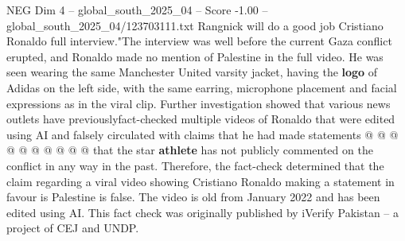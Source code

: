 \begin{textsample}{NEG Dim 4 – global\_south\_2025\_04 – Score -1.00 – global\_south\_2025\_04/123703111.txt}
Rangnick will do a good job Cristiano Ronaldo full interview."The interview was well before the current Gaza conflict erupted, and Ronaldo made no mention of Palestine in the full video.
He was seen wearing the same Manchester United varsity jacket, having the \textbf{logo} of Adidas on the left side, with the same earring, microphone placement and facial expressions as in the viral clip.
Further investigation showed that various news outlets have previouslyfact-checked multiple videos of Ronaldo that were edited using AI and falsely circulated with claims that he had made statements @ @ @ @ @ @ @ @ @ @ that the star \textbf{athlete} has not publicly commented on the conflict in any way in the past.
Therefore, the fact-check determined that the claim regarding a viral video showing Cristiano Ronaldo making a statement in favour is Palestine is false.
The video is old from January 2022 and has been edited using AI.
This fact check was originally published by iVerify Pakistan -- a project of CEJ and UNDP.

\end{textsample}
